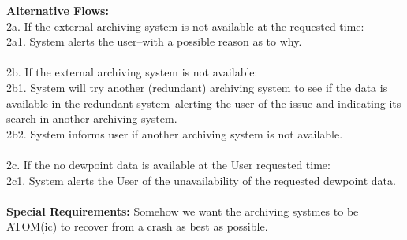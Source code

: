\documentclass[letterpaper]{article}
\begin{document}
\textbf{Alternative Flows:  }\\
2a.  If the external archiving system is not available at the
requested time:\\
2a1. System alerts the user--with a possible reason as to
why.\\\\
2b.  If the external archiving system is not available:\\
2b1. System
will try another (redundant) archiving system to see if the data is
available in the redundant system--alerting the user of the issue and
indicating its search in another archiving system.\\
2b2.  System informs user if another archiving system is not
available.\\\\
2c.  If the no dewpoint data is available at the User requested
time:\\
\quad2c1. System alerts the User of the unavailability of the
requested dewpoint data.\\\\
\textbf{Special Requirements:  }Somehow we want the archiving systmes
to be ATOM(ic) to recover from a crash as best as possible.\\\\
\end{document}
